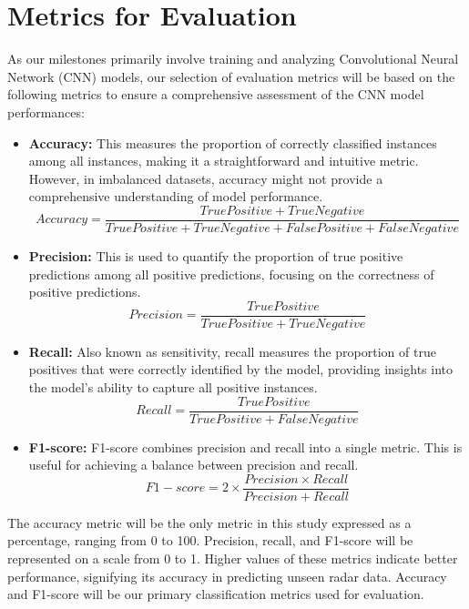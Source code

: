 \documentclass{l4proj}
\begin{document}
\section{Metrics for Evaluation}
As our milestones primarily involve training and analyzing Convolutional Neural Network (CNN) models, our selection of evaluation metrics will be based on the following metrics to ensure a comprehensive assessment of the CNN model performances:
\begin{itemize}
    \item \textbf{Accuracy:} This measures the proportion of correctly classified instances among all instances, making it a straightforward and intuitive metric. However, in imbalanced datasets, accuracy might not provide a comprehensive understanding of model performance.
    \begin{equation}
        Accuracy = \frac{True Positive + True Negative}{True Positive + True Negative + False Positive + False Negative}
    \end{equation}
    \item \textbf{Precision:} This is used to quantify the proportion of true positive predictions among all positive predictions, focusing on the correctness of positive predictions.
    \begin{equation}
        Precision = \frac{True Positive}{True Positive + True Negative}
    \end{equation}
    \item \textbf{Recall:} Also known as sensitivity, recall measures the proportion of true positives that were correctly identified by the model, providing insights into the model's ability to capture all positive instances.
    \begin{equation}
        Recall = \frac{True Positive}{True Positive + False Negative}
    \end{equation}
    \item \textbf{F1-score:} F1-score combines precision and recall into a single metric. This is useful for achieving a balance between precision and recall.
    \begin{equation}
        F1-score = 2 \times \frac{Precision \times Recall}{Precision + Recall}
    \end{equation}
\end{itemize}

The accuracy metric will be the only metric in this study expressed as a percentage, ranging from 0 to 100. Precision, recall, and F1-score will be represented on a scale from 0 to 1. Higher values of these metrics indicate better performance, signifying its accuracy in predicting unseen radar data. Accuracy and F1-score will be our primary classification metrics used for evaluation.
\end{document}
